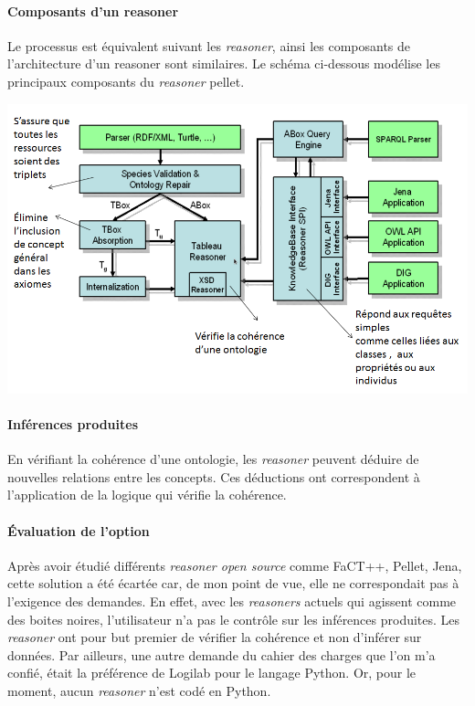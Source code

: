 \documentclass {report}
\begin{document}
\paragraph{Composants d'un reasoner} Le processus est équivalent suivant les \textit{reasoner}, ainsi les composants de l'architecture d'un reasoner sont similaires. Le schéma ci-dessous modélise les principaux composants du \textit{reasoner} pellet.


\begin{center}
\includegraphics[scale=0.7]{reasoner.png}
\end{center}

\paragraph{Inférences produites}
En vérifiant la cohérence d'une ontologie, les \textit{reasoner} peuvent déduire de nouvelles relations entre les concepts. Ces déductions ont correspondent à l'application de la logique qui vérifie la cohérence.

\paragraph{Évaluation de l'option}
Après avoir étudié différents \textit{reasoner open source} comme FaCT++, Pellet, Jena, cette solution a été écartée car, de mon point de vue, elle ne correspondait pas à l'exigence des demandes. En effet, avec les \textit{reasoners} actuels qui agissent comme des boites noires, l'utilisateur n'a pas le contrôle sur les inférences produites. Les \textit{reasoner} ont pour but premier de vérifier la cohérence et non d'inférer sur données. Par ailleurs, une autre demande du cahier des charges que l'on m'a confié, était la préférence de Logilab pour le langage Python. Or, pour le moment, aucun \textit{reasoner} n'est codé en Python.
\end{document}
